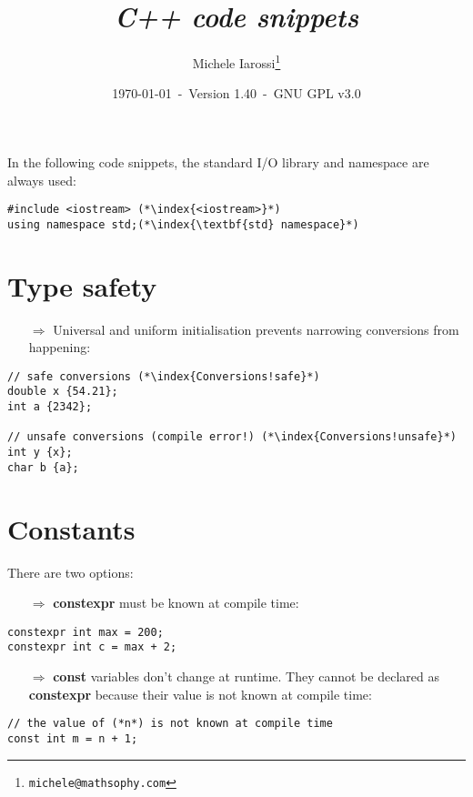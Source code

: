 \documentclass[10pt]{article}
\begin{document}
\title{\emph{C++ code snippets}}
\author{Michele Iarossi\thanks{\texttt{michele@mathsophy.com}}}
\date{\small \today~-~Version 1.40~-~GNU GPL v3.0}


\maketitle

\small

\begin{frame}{}
\setlength\columnsep{1cm}
\begin{multicols}{2}
\tableofcontents
\end{multicols}
\end{frame}

\noindent
In the following code snippets, the standard I/O library and namespace are always used:
\begin{lstlisting}
#include <iostream> (*\index{<iostream>}*)
using namespace std;(*\index{\textbf{std} namespace}*) 
\end{lstlisting}

\newpage
%
%
\section{Type safety}
\small
\begin{enumerate}
\item[$\Rightarrow$] Universal and uniform initialisation prevents narrowing conversions from happening:
\end{enumerate}
\begin{lstlisting}
// safe conversions (*\index{Conversions!safe}*)
double x {54.21};
int a {2342};

// unsafe conversions (compile error!) (*\index{Conversions!unsafe}*)
int y {x};
char b {a};
\end{lstlisting}
%
%
\section{Constants}
\small
There are two options:
\begin{enumerate}
\item[$\Rightarrow$] \textbf{constexpr} must be known at compile time:
\end{enumerate}
\begin{lstlisting}
constexpr int max = 200;
constexpr int c = max + 2;
\end{lstlisting}
\begin{enumerate}
\item[$\Rightarrow$] \textbf{const} variables don't change at runtime. They cannot be declared as
\textbf{constexpr} because their value is not known at compile time:
\end{enumerate}
\begin{lstlisting}
// the value of (*n*) is not known at compile time
const int m = n + 1;
\end{lstlisting}
%
%
\end{document}
